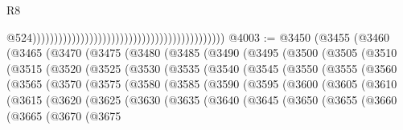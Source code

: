 \begin{lexlean}{R8}
\begin{coremodule}
                                                                                            @524))))))))))))))))))))))))))))))))))))))))))))
@4003 := @3450
    (@3455
      (@3460
        (@3465
          (@3470
            (@3475
              (@3480
                (@3485
                  (@3490
                    (@3495
                      (@3500
                        (@3505
                          (@3510
                            (@3515
                              (@3520
                                (@3525
                                  (@3530
                                    (@3535
                                      (@3540
                                        (@3545
                                          (@3550
                                            (@3555
                                              (@3560
                                                (@3565
                                                  (@3570
                                                    (@3575
                                                      (@3580
                                                        (@3585
                                                          (@3590
                                                            (@3595
                                                              (@3600
                                                                (@3605
                                                                  (@3610
                                                                    (@3615
                                                                      (@3620
                                                                        (@3625
                                                                          (@3630
                                                                            (@3635
                                                                              (@3640
                                                                                (@3645
                                                                                  (@3650
                                                                                    (@3655
                                                                                      (@3660
                                                                                        (@3665
                                                                                          (@3670
                                                                                            (@3675

\end{coremodule}
\end{lexlean}
